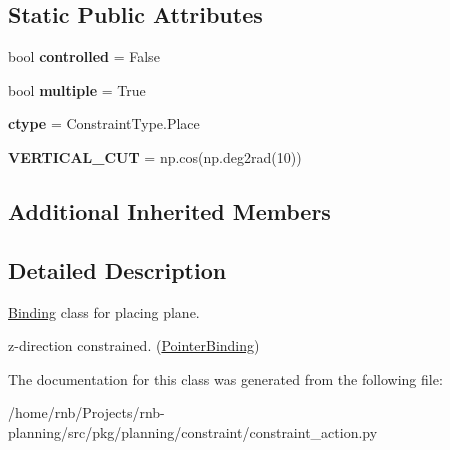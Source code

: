 \subsection*{Static Public Attributes}
\begin{DoxyCompactItemize}
\item 
\mbox{\label{classrnb-planning_1_1src_1_1pkg_1_1planning_1_1constraint_1_1constraint__action_1_1_place_plane_a7a59c88f6ebe64f2cd6e3bb89699a264}} 
bool {\bfseries controlled} = False
\item 
\mbox{\label{classrnb-planning_1_1src_1_1pkg_1_1planning_1_1constraint_1_1constraint__action_1_1_place_plane_afb40258ec64ba73c6771a6dac85e2a1a}} 
bool {\bfseries multiple} = True
\item 
\mbox{\label{classrnb-planning_1_1src_1_1pkg_1_1planning_1_1constraint_1_1constraint__action_1_1_place_plane_a9e9df214b4e673f4d3824904b00da77a}} 
{\bfseries ctype} = Constraint\+Type.\+Place
\item 
\mbox{\label{classrnb-planning_1_1src_1_1pkg_1_1planning_1_1constraint_1_1constraint__action_1_1_place_plane_a04625192e71c9b770f433a4866cebe65}} 
{\bfseries V\+E\+R\+T\+I\+C\+A\+L\+\_\+\+C\+UT} = np.\+cos(np.\+deg2rad(10))
\end{DoxyCompactItemize}
\subsection*{Additional Inherited Members}


\subsection{Detailed Description}
\hyperlink{classrnb-planning_1_1src_1_1pkg_1_1planning_1_1constraint_1_1constraint__action_1_1_binding}{Binding} class for placing plane. 

z-\/direction constrained. (\hyperlink{classrnb-planning_1_1src_1_1pkg_1_1planning_1_1constraint_1_1constraint__action_1_1_pointer_binding}{Pointer\+Binding}) 

The documentation for this class was generated from the following file\+:\begin{DoxyCompactItemize}
\item 
/home/rnb/\+Projects/rnb-\/planning/src/pkg/planning/constraint/constraint\+\_\+action.\+py\end{DoxyCompactItemize}
